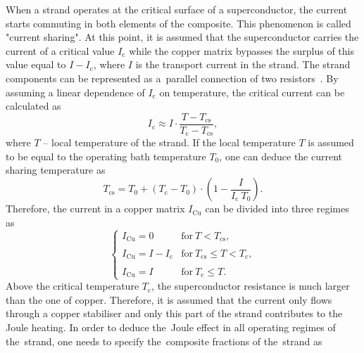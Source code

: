 When a strand operates at the critical surface of a superconductor, the current starts commuting in both elements of the composite. This phenomenon is called "current sharing". At this point, it is assumed that the superconductor carries the current of a critical value $I_\text{c}$ while the copper matrix bypasses the surplus of this value equal to $I-I_\text{c}$, where $I$ is the transport current in the strand. The strand components can be represented as a~parallel connection of two resistors~\cite[p.~119-121]{superconducting_accelerator_magnets}. By assuming a linear dependence of $I_\text{c}$ on temperature, the critical current can be calculated as
\begin{equation}
    I_\text{c} \approx I \cdot \frac{T-T_\text{cs}}{T_\text{c}-T_\text{cs}},
\end{equation}
where $T$ -- local temperature of the strand. If the local temperature $T$ is assumed to be equal to the operating bath temperature $T_0$, one can deduce the current sharing temperature as
\begin{equation}
    T_\text{cs} = T_\text{0} + (T_\text{c} - T_\text{0}) \cdot (1 - \frac{I}{I_\text{c}~T_0}).
\end{equation}
Therefore, the current in a copper matrix $I_\text{Cu}$ can be divided into three regimes as
\begin{equation}
    \left\{ \begin{array}{ lll }
    I_\text{Cu} = 0 & \text{for}~T < T_\text{cs}, \\ \\
    I_\text{Cu} = I - I_\text{c} & \text{for}~T_\text{cs} \leq T<T_\text{c},  \\ \\
    I_\text{Cu} = I & \text{for}~T_\text{c} \leq T.
    \end{array} \right.
    \label{eqn:current_sharing}
\end{equation}
Above the critical temperature $T_\text{c}$, the superconductor resistance is much larger than the one of copper. Therefore, it is assumed that the current only flows through a copper stabiliser and only this part of the strand contributes to the Joule heating. In order to deduce the~Joule effect in all operating regimes of the~strand, one needs to specify the~composite fractions of the~strand as 

